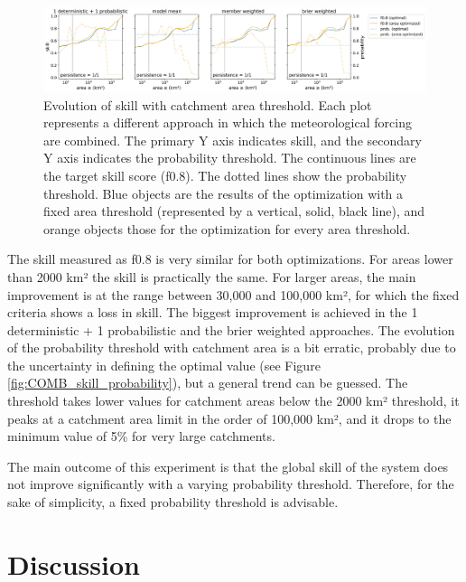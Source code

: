 \documentclass[preprint,12pt]{elsarticle}
\begin{document}
\begin{figure}
    \centering
    \includegraphics[width=1\textwidth]{figures/skill_vs_area_varying_probability_2000km2_1239points_060h.jpg}
    \caption{Evolution of skill with catchment area threshold. Each plot represents a different approach in which the meteorological forcing are combined. The primary Y axis indicates skill, and the secondary Y axis indicates the probability threshold. The continuous lines are the target skill score (f0.8). The dotted lines show the probability threshold. Blue objects are the results of the optimization with a fixed area threshold (represented by a vertical, solid, black line), and orange objects those for the optimization for every area threshold.}
    \label{fig:skill_area_probability}
\end{figure}

The skill measured as f0.8 is very similar for both optimizations. For areas lower than 2000 km² the skill is practically the same. For larger areas, the main improvement is at the range between 30,000 and 100,000 km², for which the fixed criteria shows a loss in skill. The biggest improvement is achieved in the 1 deterministic + 1 probabilistic and the  brier weighted approaches. The evolution of the probability threshold with catchment area is a bit erratic, probably due to the uncertainty in defining the optimal value (see Figure \ref{fig:COMB_skill_probability}), but a general trend can be guessed. The threshold takes lower values for catchment areas below the 2000 km² threshold, it peaks at a catchment area limit in the order of 100,000 km², and it drops to the minimum value of 5\% for very large catchments.

The main outcome of this experiment is that the global skill of the system does not improve significantly with a varying probability threshold. Therefore, for the sake of simplicity, a fixed probability threshold is advisable.

\section{Discussion}
\label{sec:discussion}
\end{document}
